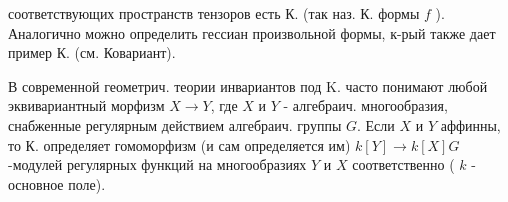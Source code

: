 \documentclass[10pt]{article}
\begin{document}
соответствующих пространств тензоров есть К. (так наз. К. формы $f$ ). Аналогично можно определить гессиан произвольной формы, к-рый также дает пример К. (см. Ковариант).



В современной геометрич. теории инвариантов под $\mathrm{K}$. часто понимают любой эквивариантный морфизм $X \rightarrow Y$, где $X$ и $Y$ - алгебраич. многообразия, снабженные регулярным действием алгебраич. группы $G$. Если $X$ и $Y$ аффинны, то $К$. определяет гомоморфизм (и сам определяется им) $k[Y] \rightarrow k[X] G$-модулей регулярных функций на многообразиях $Y$ и $X$ соответственно ( $k$ - основное поле).
\end{document}
